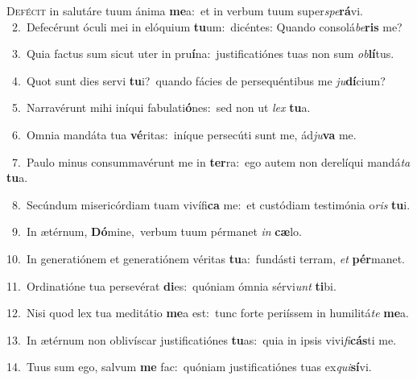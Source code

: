 \lettrine{\initial\textcolor{\initialcolor}{D}}{efécit} in salutáre tuum ánima \textbf{me}\-a:~\star et in verbum tuum super\-\textit{spe}\-\textbf{rá}vi.\\
{\numbfont\textcolor{\numbcolor}{~2.}}~Defecérunt óculi mei in elóquium \textbf{tu}\-um:~\star dicéntes: Quando consolá\-\textit{be}\-\textbf{ris} me?\par
{\numbfont\textcolor{\numbcolor}{~3.}}~Quia factus sum sicut uter in pru\-\textbf{í}\-na:~\star justificatiónes tuas non sum \textit{ob}\-\textbf{lí}tus.\par
{\numbfont\textcolor{\numbcolor}{~4.}}~Quot sunt dies servi \textbf{tu}\-i?~\star quando fácies de persequéntibus me \textit{ju}\-\textbf{dí}cium?\par
{\numbfont\textcolor{\numbcolor}{~5.}}~Narravérunt mihi iníqui fabulati\-\textbf{ó}\-nes:~\star sed non ut \textit{lex} \textbf{tu}\-a.\par
{\numbfont\textcolor{\numbcolor}{~6.}}~Omnia mandáta tua \textbf{vé}\-ritas:~\star iníque persecúti sunt me, ád\-\textit{ju}\-\textbf{va} me.\par
{\numbfont\textcolor{\numbcolor}{~7.}}~Paulo minus consummavérunt me in \textbf{ter}\-ra:~\star ego autem non derelíqui mandá\textit{ta} \textbf{tu}\-a.\par
{\numbfont\textcolor{\numbcolor}{~8.}}~Secúndum misericórdiam tuam vivífi\textbf{ca} me:~\star et custódiam testimónia o\textit{ris} \textbf{tu}\-i.\par
{\numbfont\textcolor{\numbcolor}{~9.}}~In ætérnum, \textbf{Dó}\-mine,~\star verbum tuum pérmanet \textit{in} \textbf{cæ}\-lo.\par
{\numbfont\textcolor{\numbcolor}{10.}}~In generatiónem et generatiónem véritas \textbf{tu}\-a:~\star fundásti terram, \textit{et} \textbf{pér}\-manet.\par
{\numbfont\textcolor{\numbcolor}{11.}}~Ordinatióne tua persevérat \textbf{di}\-es:~\star quóniam ómnia sérvi\textit{unt} \textbf{ti}\-bi.\par
{\numbfont\textcolor{\numbcolor}{12.}}~Nisi quod lex tua meditátio \textbf{me}\-a est:~\star tunc forte periíssem in humilitá\textit{te} \textbf{me}\-a.\par
{\numbfont\textcolor{\numbcolor}{13.}}~In ætérnum non oblivíscar justificatiónes \textbf{tu}\-as:~\star quia in ipsis vivi\-\textit{fi}\-\textbf{cás}ti me.\par
{\numbfont\textcolor{\numbcolor}{14.}}~Tuus sum ego, salvum \textbf{me} fac:~\star quóniam justificatiónes tuas ex\-\textit{qui}\-\textbf{sí}vi.\par
